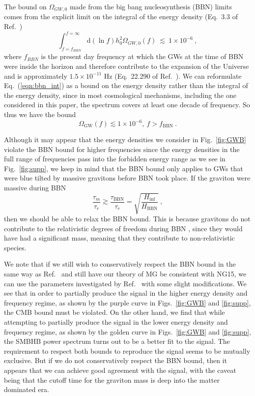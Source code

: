\documentclass[prd,twocolumn,aps,psfig,nofootinbib,nobibnotes,superscriptaddress,preprintnumbers,times]{revtex4-2}
\newcommand{\eq}[1]{(\ref{#1})}
\begin{document}
The bound on $\Omega_{GW,0}$ made from the big bang nucleosynthesis (BBN) limits comes from the explicit limit on the integral of the energy density (Eq.\ 3.3 of Ref.\ \cite{Tanin:2020qjw}) 
\begin{equation} \label{eqn:bbn_int}
    \int_{f = f_{BBN}}^{f = \infty}\mbox{d}(\ln{f}) h_0^2\Omega_{GW,0}(f) \ \lesssim\ 1\times 10^{-6} \ ,
\end{equation} 
where $f_{BBN}$ is the present day frequency at which the GWs at the time of BBN were inside the horizon and therefore contribute to the expansion of the Universe and is approximately $1.5\times 10^{-11}$ Hz (Eq.\ 22.290 of Ref.\ \cite{Maggiore:v2}). We can reformulate Eq.\ \eq{eqn:bbn_int} as a bound on the energy density rather than the integral of the energy density, since in most cosmological mechanisms, including the one considered in this paper, the spectrum covers at least one decade of frequency. So thus we have the bound 
\begin{equation}
    \Omega_{\text{GW}}(f) \lesssim 1 \times 10^{-6},\ f > f_{\text{BBN}} \ .
\end{equation}

Although it may appear that the energy densities we consider in Fig.\ \ref{fig:GWB} violate the BBN bound for higher frequencies since the energy densities in the full range of frequencies pass into the forbidden energy range as we see in Fig.\ \ref{fig:supp}, we keep in mind that the BBN bound only applies to GWs that were blue tilted by massive gravitons before BBN took place. If the graviton were massive during BBN 
\begin{equation}\label{eqn:massive_bbn}
    \frac{\tau_m}{\tau_r} \gtrsim \frac{\tau_{\text{BBN}}}{\tau_r} = \sqrt{\frac{H_{\inf}}{H_{\text{BBN}}}}\ ,
\end{equation}
then we should be able to relax the BBN bound. This is because gravitons do not contribute to the relativistic degrees of freedom during BBN \cite{Fujita:2018ehq}, since they would have had a significant mass, meaning that they contribute to non-relativistic species.

We note that if we still wish to conservatively respect the BBN bound in the same way as Ref.\ \cite{Fujita:2018ehq} and still have our theory of MG be consistent with NG15, we can use the parameters investigated by Ref.\ \cite{Fujita:2018ehq} with some slight modifications. We see that in order to partially produce the signal in the higher energy density and frequency regime, as shown by the purple curve in Figs.\ \ref{fig:GWB} and \ref{fig:supp}, the CMB bound must be violated. On the other hand, we find that while attempting to partially produce the signal in the lower energy density and frequency regime, as shown by the golden curve in Figs.\ \ref{fig:GWB} and \ref{fig:supp}, the SMBHB power spectrum turns out to be a better fit to the signal. The requirement to respect both bounds to reproduce the signal seems to be mutually exclusive. But if we do not conservatively respect the BBN bound, then it appears that we can achieve good agreement with the signal, with the caveat being that the cutoff time for the graviton mass is deep into the matter dominated era.
\end{document}
